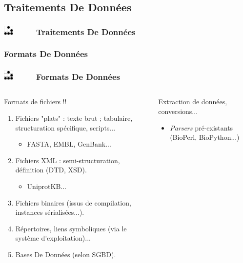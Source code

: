 \documentclass[slidetop,11pt]{beamer}
\def\sectionPartIb{Traitements De Donn{\'e}es}
\def\sectionPartIbUN{Formats De Donn{\'e}es}
\def\moreInFrameTitle{\includegraphics[height=0.5cm]{img/logo_glider.png}~~~~~}
\begin{document}
\subsection{\sectionPartIb}
\begin{frame}
	\frametitle{\moreInFrameTitle \sectionPartIb}
	\tableofcontents[sections=2,subsectionstyle=show/shaded/hide]
\end{frame} 

\subsubsection{\sectionPartIbUN}
\begin{frame}
	\frametitle{\moreInFrameTitle \sectionPartIbUN}
	\begin{columns}[t]
	\begin{column}[c]{6cm}
		\begin{beamerboxesrounded}	[lower=substructureUN, %
		 				 upper=block title UN,%
						 shadow=true]%
		       {Formats de fichiers !!}
		        \begin{enumerate}
				\item Fichiers "plats" : texte brut ; tabulaire, structuration sp{\'e}cifique, scripts...
					\begin{itemize} \item FASTA, EMBL, GenBank... \end{itemize}
				\item Fichiers XML : semi-structuration, d{\'e}finition (DTD, XSD). 
					\begin{itemize} \item UniprotKB... \end{itemize}
				\item Fichiers binaires (issus de compilation, instances s{\'e}rialis{\'e}es...). 
				\item R{\'e}pertoires, liens symboliques (via le syst{\`e}me d'exploitation)...
				\item Bases De Donn{\'e}es (selon SGBD). 
			\end{enumerate}
		 \end{beamerboxesrounded}
	\end{column}
	\begin{column}[c]{6cm}
		 \begin{beamerboxesrounded}	[lower=substructureTR, %
		 				 upper=block title TR,%
						 shadow=true]%
		       {Extraction de donn{\'e}es, conversions...}
		        \begin{itemize}
				\item \emph{Parsers} pr{\'e}-existants (BioPerl, BioPython...)

\end{itemize}
\end{beamerboxesrounded}
\end{column}
\end{columns}
\end{frame}
\end{document}
